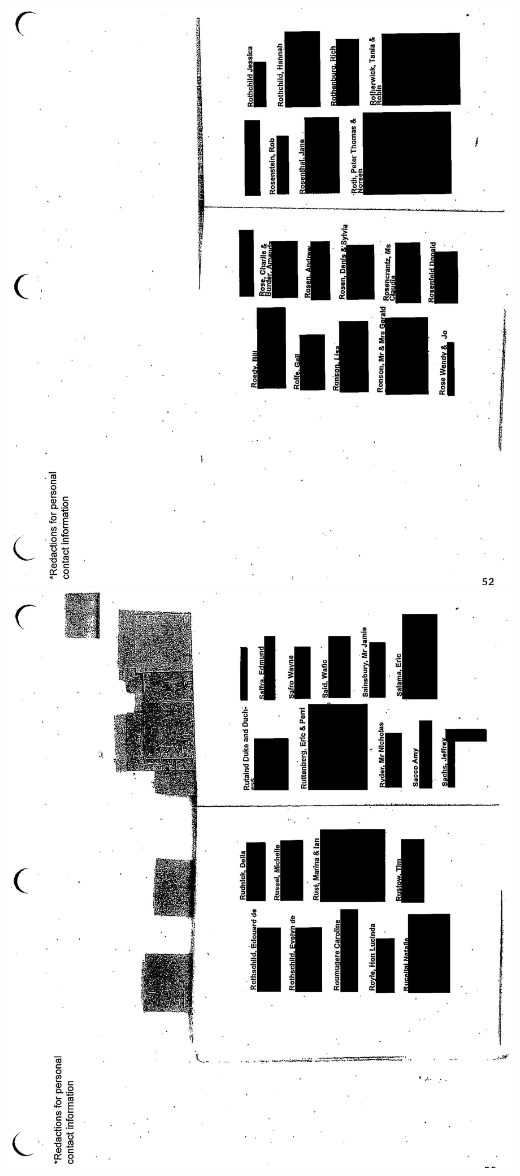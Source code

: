 \documentclass[10pt]{article}
\begin{document}
\includegraphics[max width=\textwidth, center]{2025_02_27_dd68c3d38de88f0516d9g-169}\\
\includegraphics[max width=\textwidth, center]{2025_02_27_dd68c3d38de88f0516d9g-170}\\
\end{document}
